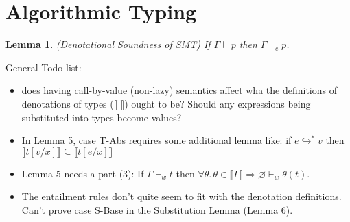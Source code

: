 \documentclass[11pt]{article}
\newtheorem{lemma}[theorem]{Lemma}
\newcommand{\lb}{\llbracket}         %
\newcommand{\rb}{\rrbracket}         %
\newcommand{\many}{\hookrightarrow^*}
\newcommand{\foralltheta}{\forall\theta.\,\theta\in\lb\Gamma\rb}
\begin{document}
\section{Algorithmic Typing} %

\begin{lemma}\label{SMT-Entails}
(Denotational Soundness of SMT) If $\Gamma \vdash p$ then $\Gamma \vdash_e p$.
\end{lemma}


\newpage
General Todo list:
\begin{itemize}
	\item does having call-by-value (non-lazy) semantics affect wha the definitions of denotations of types ($\lb \; \rb$) ought to be? Should any expressions being substituted into types become values?
	\item In Lemma 5, case {\sc T-Abs} requires some additional lemma like: if $e \many v$ then $\lb t[v/x] \rb \subseteq \lb t[e/x] \rb$
	\item Lemma 5 needs a part (3): If $\Gamma \vdash_w t$ then $\foralltheta \Rightarrow \varnothing \vdash_w \theta(t)$.
	\item The entailment rules don't quite seem to fit with the denotation definitions. Can't prove case {\sc S-Base} in the Substitution Lemma (Lemma 6).
	
\end{itemize}
\end{document}
